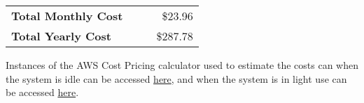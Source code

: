 \documentclass[a4paper, 11pt]{article}
\newcommand{\estimatedCostInIdleURL}{https://calculator.aws/\#/estimate?id=d3e602b082d82bd97aafcc93904ce67516634eb8}
\newcommand{\estimatedCostInUseURL}{https://calculator.aws/\#/estimate?id=b4dc230cd3bee2c549dd81bb9eece77d7a694213}
\begin{document}
\begin{table}[htbp]
    \setlength{\tableRowSpacing}{3pt}   %
    
    \centering
    \begin{tabularx}{\textwidth}{XXrr}
        \midrule \addlinespace[2\tableRowSpacing]
        \textbf{Total Monthly Cost}   &&& \$23.96 \\    \addlinespace[\tableRowSpacing]
        \textbf{Total Yearly Cost}   &&& \$287.78 \\
        \bottomrule
    \end{tabularx}
\end{table}

Instances of the AWS Cost Pricing calculator used to estimate the costs can when the system is idle can be accessed \href{\estimatedCostInIdleURL}{here}, and when the system is in light use can be accessed \href{\estimatedCostInUseURL}{here}.

    
    
\end{document}
